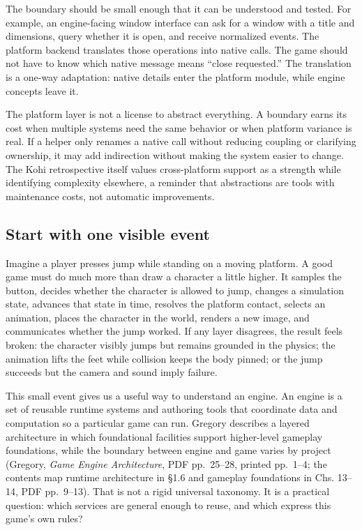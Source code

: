The boundary should be small enough that it can be understood and tested. For example, an engine-facing window interface can ask for a window with a title and dimensions, query whether it is open, and receive normalized events. The platform backend translates those operations into native calls. The game should not have to know which native message means ``close requested.'' The translation is a one-way adaptation: native details enter the platform module, while engine concepts leave it.

The platform layer is not a license to abstract everything. A boundary earns its cost when multiple systems need the same behavior or when platform variance is real. If a helper only renames a native call without reducing coupling or clarifying ownership, it may add indirection without making the system easier to change. The Kohi retrospective itself values cross-platform support as a strength while identifying complexity elsewhere, a reminder that abstractions are tools with maintenance costs, not automatic improvements.

\subsection{Start with one visible event}\label{05-engine-i-ch013-start-with-one-visible-event}

Imagine a player presses jump while standing on a moving platform. A good game must do much more than draw a character a little higher. It samples the button, decides whether the character is allowed to jump, changes a simulation state, advances that state in time, resolves the platform contact, selects an animation, places the character in the world, renders a new image, and communicates whether the jump worked. If any layer disagrees, the result feels broken: the character visibly jumps but remains grounded in the physics; the animation lifts the feet while collision keeps the body pinned; or the jump succeeds but the camera and sound imply failure.

This small event gives us a useful way to understand an engine. An engine is a set of reusable runtime systems and authoring tools that coordinate data and computation so a particular game can run. Gregory describes a layered architecture in which foundational facilities support higher-level gameplay foundations, while the boundary between engine and game varies by project (Gregory, \emph{Game Engine Architecture}, PDF pp.~25--28, printed pp.~1--4; the contents map runtime architecture in §1.6 and gameplay foundations in Chs. 13--14, PDF pp.~9--13). That is not a rigid universal taxonomy. It is a practical question: which services are general enough to reuse, and which express this game's own rules?

